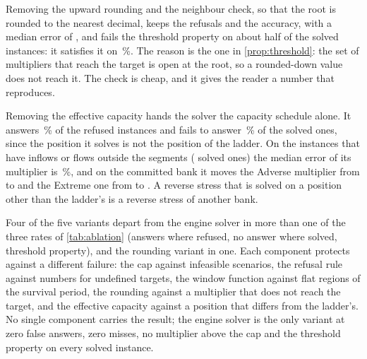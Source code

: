 Removing the upward rounding and the neighbour check, so that the root is rounded to the nearest decimal, keeps the refusals and the accuracy, with a median error of \kRErr{}, and fails the threshold property on about half of the solved instances: it satisfies it on \kRThr{}\,\%. The reason is the one in \cref{prop:threshold}: the set of multipliers that reach the target is open at the root, so a rounded-down value does not reach it. The check is cheap, and it gives the reader a number that reproduces.

Removing the effective capacity hands the solver the capacity schedule alone. It answers \kWFalse{}\,\% of the refused instances and fails to answer \kWMiss{}\,\% of the solved ones, since the position it solves is not the position of the ladder. On the instances that have inflows or flows outside the segments (\kRawFlowsN{} solved ones) the median error of its multiplier is \kRawFlows{}\,\%, and on the committed bank it moves the Adverse multiplier from \mAdv{} to \rawAdv{} and the Extreme one from \mExt{} to \rawExt{}. A reverse stress that is solved on a position other than the ladder's is a reverse stress of another bank.

Four of the five variants depart from the engine solver in more than one of the three rates of \cref{tab:ablation} (answers where refused, no answer where solved, threshold property), and the rounding variant in one. Each component protects against a different failure: the cap against infeasible scenarios, the refusal rule against numbers for undefined targets, the window function against flat regions of the survival period, the rounding against a multiplier that does not reach the target, and the effective capacity against a position that differs from the ladder's. No single component carries the result; the engine solver is the only variant at zero false answers, zero misses, no multiplier above the cap and the threshold property on every solved instance.
